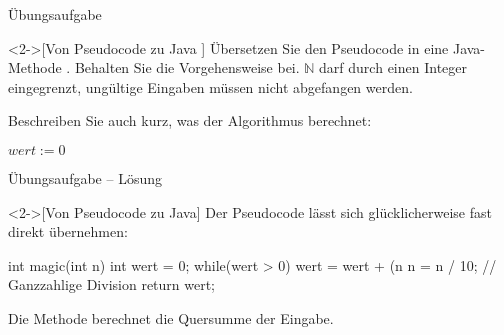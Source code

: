 \begin{frame}[fragile,c]{Übungsaufgabe}
    \begin{exercise}<2->[Von Pseudocode zu Java ]
        \pause{}Übersetzen Sie den Pseudocode in eine Java-Methode . Behalten Sie die Vorgehensweise bei. \(\mathbb{N}\) darf durch einen Integer eingegrenzt, ungültige Eingaben müssen nicht abgefangen werden.\medskip\par\pause Beschreiben Sie auch kurz, was der Algorithmus berechnet:\par\pause
{}%
%
%
\SetAlgoVlined%
\begin{algorithm}[H]
\PreCode
{}
\StartCode
    \(wert := 0\)\;
    \;
\end{algorithm}
    \end{exercise}
\end{frame}

\begin{frame}[fragile,c]{Übungsaufgabe -- Lösung}
    \begin{solve}<2->[Von Pseudocode zu Java]
        \pause{}Der Pseudocode lässt sich glücklicherweise fast direkt übernehmen:
\begin{plainjava}
int magic(int n) {
    int wert = 0;
    while(wert > 0) {
        wert = wert + (n %
        n = n / 10; // Ganzzahlige Division
    }
    return wert;
}
\end{plainjava}
        \pause{}Die Methode berechnet die Quersumme der Eingabe.
    \end{solve}
\end{frame}
\fi